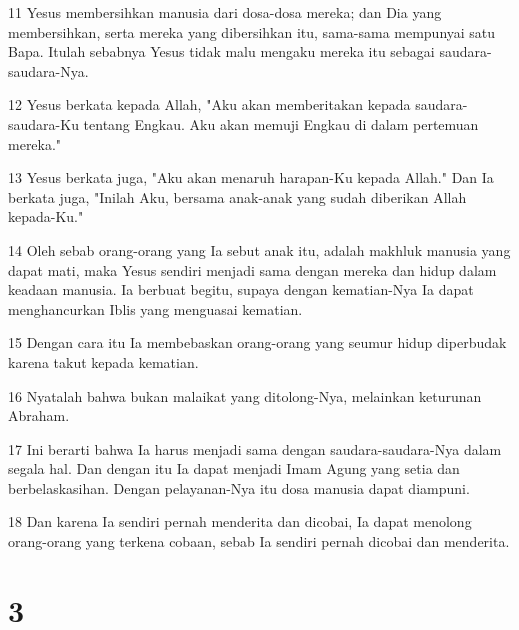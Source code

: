 \par 11 Yesus membersihkan manusia dari dosa-dosa mereka; dan Dia yang membersihkan, serta mereka yang dibersihkan itu, sama-sama mempunyai satu Bapa. Itulah sebabnya Yesus tidak malu mengaku mereka itu sebagai saudara-saudara-Nya.
\par 12 Yesus berkata kepada Allah, "Aku akan memberitakan kepada saudara-saudara-Ku tentang Engkau. Aku akan memuji Engkau di dalam pertemuan mereka."
\par 13 Yesus berkata juga, "Aku akan menaruh harapan-Ku kepada Allah." Dan Ia berkata juga, "Inilah Aku, bersama anak-anak yang sudah diberikan Allah kepada-Ku."
\par 14 Oleh sebab orang-orang yang Ia sebut anak itu, adalah makhluk manusia yang dapat mati, maka Yesus sendiri menjadi sama dengan mereka dan hidup dalam keadaan manusia. Ia berbuat begitu, supaya dengan kematian-Nya Ia dapat menghancurkan Iblis yang menguasai kematian.
\par 15 Dengan cara itu Ia membebaskan orang-orang yang seumur hidup diperbudak karena takut kepada kematian.
\par 16 Nyatalah bahwa bukan malaikat yang ditolong-Nya, melainkan keturunan Abraham.
\par 17 Ini berarti bahwa Ia harus menjadi sama dengan saudara-saudara-Nya dalam segala hal. Dan dengan itu Ia dapat menjadi Imam Agung yang setia dan berbelaskasihan. Dengan pelayanan-Nya itu dosa manusia dapat diampuni.
\par 18 Dan karena Ia sendiri pernah menderita dan dicobai, Ia dapat menolong orang-orang yang terkena cobaan, sebab Ia sendiri pernah dicobai dan menderita.

\chapter{3}

